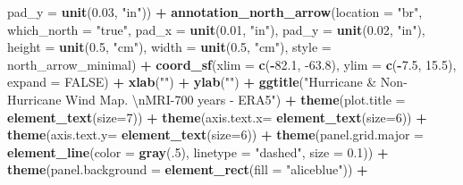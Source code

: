 \documentclass[12pt,oneside]{reedthesis}
\newenvironment{Shaded}{\begin{snugshade}}{\end{snugshade}}
\newcommand{\CharTok}[1]{\textcolor[rgb]{0.31,0.60,0.02}{#1}}
\newcommand{\DataTypeTok}[1]{\textcolor[rgb]{0.13,0.29,0.53}{#1}}
\newcommand{\DecValTok}[1]{\textcolor[rgb]{0.00,0.00,0.81}{#1}}
\newcommand{\FloatTok}[1]{\textcolor[rgb]{0.00,0.00,0.81}{#1}}
\newcommand{\KeywordTok}[1]{\textcolor[rgb]{0.13,0.29,0.53}{\textbf{#1}}}
\newcommand{\NormalTok}[1]{#1}
\newcommand{\OperatorTok}[1]{\textcolor[rgb]{0.81,0.36,0.00}{\textbf{#1}}}
\newcommand{\OtherTok}[1]{\textcolor[rgb]{0.56,0.35,0.01}{#1}}
\newcommand{\StringTok}[1]{\textcolor[rgb]{0.31,0.60,0.02}{#1}}
\begin{document}
\begin{Shaded}
\begin{Highlighting}[]
   \DataTypeTok{pad_y =} \KeywordTok{unit}\NormalTok{(}\FloatTok{0.03}\NormalTok{, }\StringTok{"in"}\NormalTok{)) }\OperatorTok{+}\StringTok{ }
\StringTok{  }\KeywordTok{annotation_north_arrow}\NormalTok{(}\DataTypeTok{location =} \StringTok{"br"}\NormalTok{, }\DataTypeTok{which_north =} \StringTok{"true"}\NormalTok{, }\DataTypeTok{pad_x =} \KeywordTok{unit}\NormalTok{(}\FloatTok{0.01}\NormalTok{, }\StringTok{"in"}\NormalTok{), }\DataTypeTok{pad_y =} \KeywordTok{unit}\NormalTok{(}\FloatTok{0.02}\NormalTok{, }\StringTok{"in"}\NormalTok{), }\DataTypeTok{height =} \KeywordTok{unit}\NormalTok{(}\FloatTok{0.5}\NormalTok{, }\StringTok{"cm"}\NormalTok{), }
   \DataTypeTok{width =} \KeywordTok{unit}\NormalTok{(}\FloatTok{0.5}\NormalTok{, }\StringTok{"cm"}\NormalTok{), }\DataTypeTok{style =}\NormalTok{ north_arrow_minimal) }\OperatorTok{+}
\StringTok{  }\KeywordTok{coord_sf}\NormalTok{(}\DataTypeTok{xlim =} \KeywordTok{c}\NormalTok{(}\OperatorTok{-}\FloatTok{82.1}\NormalTok{, }\FloatTok{-63.8}\NormalTok{), }\DataTypeTok{ylim =} \KeywordTok{c}\NormalTok{(}\OperatorTok{-}\FloatTok{7.5}\NormalTok{, }\FloatTok{15.5}\NormalTok{), }\DataTypeTok{expand =} \OtherTok{FALSE}\NormalTok{) }\OperatorTok{+}
\StringTok{  }\KeywordTok{xlab}\NormalTok{(}\StringTok{""}\NormalTok{) }\OperatorTok{+}\StringTok{ }
\StringTok{  }\KeywordTok{ylab}\NormalTok{(}\StringTok{""}\NormalTok{) }\OperatorTok{+}\StringTok{ }
\StringTok{  }\KeywordTok{ggtitle}\NormalTok{(}\StringTok{"Hurricane & Non-Hurricane Wind Map. }\CharTok{\textbackslash{}n}\StringTok{MRI-700 years - ERA5"}\NormalTok{) }\OperatorTok{+}\StringTok{ }
\StringTok{  }\KeywordTok{theme}\NormalTok{(}\DataTypeTok{plot.title =} \KeywordTok{element_text}\NormalTok{(}\DataTypeTok{size=}\DecValTok{7}\NormalTok{)) }\OperatorTok{+}
\StringTok{  }\KeywordTok{theme}\NormalTok{(}\DataTypeTok{axis.text.x=} \KeywordTok{element_text}\NormalTok{(}\DataTypeTok{size=}\DecValTok{6}\NormalTok{)) }\OperatorTok{+}\StringTok{ }
\StringTok{  }\KeywordTok{theme}\NormalTok{(}\DataTypeTok{axis.text.y=} \KeywordTok{element_text}\NormalTok{(}\DataTypeTok{size=}\DecValTok{6}\NormalTok{)) }\OperatorTok{+}
\StringTok{  }\KeywordTok{theme}\NormalTok{(}\DataTypeTok{panel.grid.major =} \KeywordTok{element_line}\NormalTok{(}\DataTypeTok{color =} \KeywordTok{gray}\NormalTok{(.}\DecValTok{5}\NormalTok{), }\DataTypeTok{linetype =} \StringTok{"dashed"}\NormalTok{, }\DataTypeTok{size =} \FloatTok{0.1}\NormalTok{)) }\OperatorTok{+}
\StringTok{  }\KeywordTok{theme}\NormalTok{(}\DataTypeTok{panel.background =} \KeywordTok{element_rect}\NormalTok{(}\DataTypeTok{fill =} \StringTok{"aliceblue"}\NormalTok{)) }\OperatorTok{+}

\end{Highlighting}
\end{Shaded}
\end{document}
